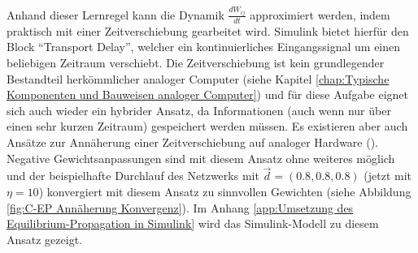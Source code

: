 Anhand dieser Lernregel kann die Dynamik \(\frac{dW_{ij}}{dt}\) approximiert werden, indem praktisch mit einer Zeitverschiebung gearbeitet wird. Simulink bietet hierfür den Block "`Transport Delay"', welcher ein kontinuierliches Eingangssignal um einen beliebigen Zeitraum verschiebt. Die Zeitverschiebung ist kein grundlegender Bestandteil herkömmlicher analoger Computer (siehe Kapitel \ref{chap:Typische Komponenten und Bauweisen analoger Computer}) und für diese Aufgabe eignet sich auch wieder ein hybrider Ansatz, da Informationen (auch wenn nur über einen sehr kurzen Zeitraum) gespeichert werden müssen. Es existieren aber auch Ansätze zur Annäherung einer Zeitverschiebung auf analoger Hardware (\cite[vgl. S. 117 ff.]{Ulmann2022}). Negative Gewichtsanpassungen sind mit diesem Ansatz ohne weiteres möglich und der beispielhafte Durchlauf des Netzwerks mit \(\vec{d}=(0.8,0.8,0.8)\) (jetzt mit \(\eta=10\)) konvergiert mit diesem Ansatz zu sinnvollen Gewichten (siehe Abbildung \ref{fig:C-EP Annäherung Konvergenz}). Im Anhang \ref{app:Umsetzung des Equilibrium-Propagation in Simulink} wird das Simulink-Modell zu diesem Ansatz gezeigt.

